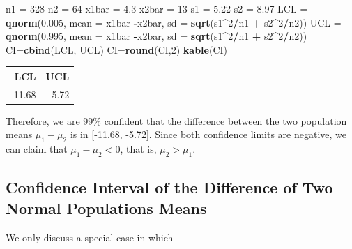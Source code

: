 \documentclass[
]{book}
\newenvironment{Shaded}{\begin{snugshade}}{\end{snugshade}}
\newcommand{\AttributeTok}[1]{\textcolor[rgb]{0.13,0.29,0.53}{#1}}
\newcommand{\DecValTok}[1]{\textcolor[rgb]{0.00,0.00,0.81}{#1}}
\newcommand{\FloatTok}[1]{\textcolor[rgb]{0.00,0.00,0.81}{#1}}
\newcommand{\FunctionTok}[1]{\textcolor[rgb]{0.13,0.29,0.53}{\textbf{#1}}}
\newcommand{\NormalTok}[1]{#1}
\newcommand{\OtherTok}[1]{\textcolor[rgb]{0.56,0.35,0.01}{#1}}
\newcommand{\SpecialCharTok}[1]{\textcolor[rgb]{0.81,0.36,0.00}{\textbf{#1}}}
\begin{document}
\begin{Shaded}
\begin{Highlighting}[]
\NormalTok{n1 }\OtherTok{=} \DecValTok{328}
\NormalTok{n2 }\OtherTok{=} \DecValTok{64}
\NormalTok{x1bar }\OtherTok{=} \FloatTok{4.3}
\NormalTok{x2bar }\OtherTok{=} \DecValTok{13}
\NormalTok{s1 }\OtherTok{=} \FloatTok{5.22}
\NormalTok{s2 }\OtherTok{=} \FloatTok{8.97}
\NormalTok{LCL }\OtherTok{=} \FunctionTok{qnorm}\NormalTok{(}\FloatTok{0.005}\NormalTok{, }\AttributeTok{mean =}\NormalTok{ x1bar }\SpecialCharTok{{-}}\NormalTok{x2bar, }\AttributeTok{sd =} \FunctionTok{sqrt}\NormalTok{(s1}\SpecialCharTok{\^{}}\DecValTok{2}\SpecialCharTok{/}\NormalTok{n1 }\SpecialCharTok{+}\NormalTok{ s2}\SpecialCharTok{\^{}}\DecValTok{2}\SpecialCharTok{/}\NormalTok{n2))}
\NormalTok{UCL }\OtherTok{=} \FunctionTok{qnorm}\NormalTok{(}\FloatTok{0.995}\NormalTok{, }\AttributeTok{mean =}\NormalTok{ x1bar }\SpecialCharTok{{-}}\NormalTok{x2bar, }\AttributeTok{sd =} \FunctionTok{sqrt}\NormalTok{(s1}\SpecialCharTok{\^{}}\DecValTok{2}\SpecialCharTok{/}\NormalTok{n1 }\SpecialCharTok{+}\NormalTok{ s2}\SpecialCharTok{\^{}}\DecValTok{2}\SpecialCharTok{/}\NormalTok{n2))}
\NormalTok{CI}\OtherTok{=}\FunctionTok{cbind}\NormalTok{(LCL, UCL)}
\NormalTok{CI}\OtherTok{=}\FunctionTok{round}\NormalTok{(CI,}\DecValTok{2}\NormalTok{)}
\FunctionTok{kable}\NormalTok{(CI)}
\end{Highlighting}
\end{Shaded}

\begin{tabular}{r|r}
\hline
LCL & UCL\\
\hline
-11.68 & -5.72\\
\hline
\end{tabular}

Therefore, we are 99\% confident that the difference between the two population means \(\mu_1-\mu_2\) is in {[}-11.68, -5.72{]}. Since both confidence limits are negative, we can claim that \(\mu_1-\mu_2 < 0\), that is, \(\mu_2 > \mu_1\).

\hypertarget{confidence-interval-of-the-difference-of-two-normal-populations-means}{%
\subsection{Confidence Interval of the Difference of Two Normal Populations Means}\label{confidence-interval-of-the-difference-of-two-normal-populations-means}}

We only discuss a special case in which
\end{document}

